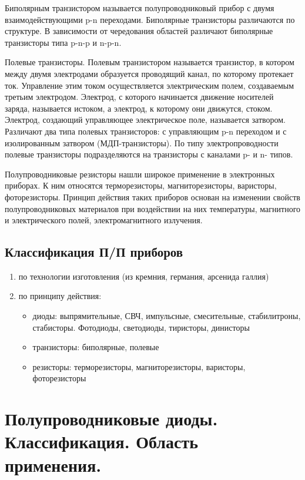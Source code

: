 \documentclass[unicode, 12pt, a4paper, oneside]{article}
\begin{document}
Биполярным транзистором называется полупроводниковый прибор с двумя взаимодействующими p-n переходами. Биполярные транзисторы различаются по структуре. В зависимости от чередования областей различают биполярные транзисторы типа p-n-p и n-p-n.

Полевые транзисторы. Полевым транзистором называется транзистор, в котором между двумя электродами образуется проводящий канал, по которому протекает ток. Управление этим током осуществляется электрическим полем, создаваемым третьим электродом. Электрод, с которого начинается движение носителей заряда, называется истоком, а электрод, к которому они движутся, стоком. Электрод, создающий управляющее электрическое поле, называется затвором. Различают два типа полевых транзисторов: с управляющим p-n переходом и с изолированным затвором (МДП-транзисторы). По типу электропроводности полевые транзисторы подразделяются на транзисторы с каналами p- и n- типов.

Полупроводниковые резисторы нашли широкое применение в электронных приборах. К ним относятся терморезисторы, магниторезисторы, варисторы, фоторезисторы. Принцип действия таких приборов основан на изменении свойств полупроводниковых материалов при воздействии на них температуры, магнитного и электрического полей, электромагнитного излучения.

\subsection*{Классификация П/П приборов}

\begin{enumerate}
\item по технологии изготовления (из кремния, германия, арсенида галлия)
\item по принципу действия:
	\begin{itemize}
	\item диоды: выпрямительные, СВЧ, импульсные, смесительные, стабилитроны, стабисторы. Фотодиоды, светодиоды, тиристоры, динисторы
	\item транзисторы: биполярные, полевые
	\item резисторы: терморезисторы, магниторезисторы, варисторы, фоторезисторы
	\end{itemize}
\end{enumerate}


\section{Полупроводниковые диоды. Классификация. Область применения.}
\end{document}
